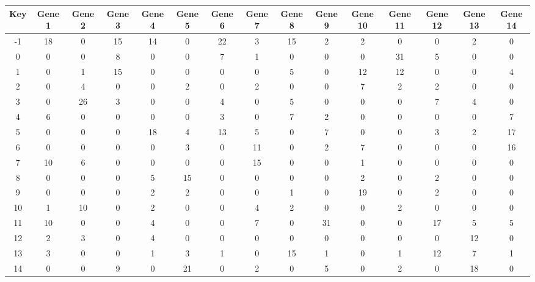 \begin{tabular}{|c|c|c|c|c|c|c|c|c|c|c|c|c|c|c|}
\hline
Key & Gene 1 & Gene 2 & Gene 3 & Gene 4 & Gene 5 & Gene 6 & Gene 7 & Gene 8 & Gene 9 & Gene 10 & Gene 11 & Gene 12 & Gene 13 & Gene 14 \\
\hline
-1 & 18 & 0 & 15 & 14 & 0 & 22 & 3 & 15 & 2 & 2 & 0 & 0 & 2 & 0 \\
0 & 0 & 0 & 8 & 0 & 0 & 7 & 1 & 0 & 0 & 0 & 31 & 5 & 0 & 0 \\
1 & 0 & 1 & 15 & 0 & 0 & 0 & 0 & 5 & 0 & 12 & 12 & 0 & 0 & 4 \\
2 & 0 & 4 & 0 & 0 & 2 & 0 & 2 & 0 & 0 & 7 & 2 & 2 & 0 & 0 \\
3 & 0 & 26 & 3 & 0 & 0 & 4 & 0 & 5 & 0 & 0 & 0 & 7 & 4 & 0 \\
4 & 6 & 0 & 0 & 0 & 0 & 3 & 0 & 7 & 2 & 0 & 0 & 0 & 0 & 7 \\
5 & 0 & 0 & 0 & 18 & 4 & 13 & 5 & 0 & 7 & 0 & 0 & 3 & 2 & 17 \\
6 & 0 & 0 & 0 & 0 & 3 & 0 & 11 & 0 & 2 & 7 & 0 & 0 & 0 & 16 \\
7 & 10 & 6 & 0 & 0 & 0 & 0 & 15 & 0 & 0 & 1 & 0 & 0 & 0 & 0 \\
8 & 0 & 0 & 0 & 5 & 15 & 0 & 0 & 0 & 0 & 2 & 0 & 2 & 0 & 0 \\
9 & 0 & 0 & 0 & 2 & 2 & 0 & 0 & 1 & 0 & 19 & 0 & 2 & 0 & 0 \\
10 & 1 & 10 & 0 & 2 & 0 & 0 & 4 & 2 & 0 & 0 & 2 & 0 & 0 & 0 \\
11 & 10 & 0 & 0 & 4 & 0 & 0 & 7 & 0 & 31 & 0 & 0 & 17 & 5 & 5 \\
12 & 2 & 3 & 0 & 4 & 0 & 0 & 0 & 0 & 0 & 0 & 0 & 0 & 12 & 0 \\
13 & 3 & 0 & 0 & 1 & 3 & 1 & 0 & 15 & 1 & 0 & 1 & 12 & 7 & 1 \\
14 & 0 & 0 & 9 & 0 & 21 & 0 & 2 & 0 & 5 & 0 & 2 & 0 & 18 & 0 \\
\hline
\end{tabular}